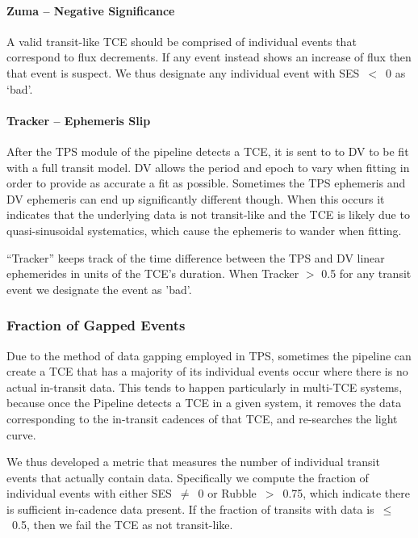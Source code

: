 \paragraph{Zuma -- Negative Significance}
\label{s:zuma}

A valid transit-like TCE should be comprised of individual events that correspond to flux decrements. If any event instead shows an increase of flux then that event is suspect. We thus designate any individual event with SES~$<$~0 as `bad'.


\paragraph{Tracker -- Ephemeris Slip}
\label{s:tracker}
After the TPS module of the \kepler{} pipeline detects a TCE, it is sent to to DV to be fit with a full transit model. DV allows the period and epoch to vary when fitting in order to provide as accurate a fit as possible. Sometimes the TPS ephemeris and DV ephemeris can end up significantly different though. When this occurs it indicates that the underlying data is not transit-like and the TCE is likely due to quasi-sinusoidal systematics, which cause the ephemeris to wander when fitting.

``Tracker'' keeps track of the time difference between the TPS and DV linear ephemerides in units of the TCE's duration. When Tracker $>$ 0.5 for any transit event we designate the event as 'bad'.


\subsubsection{Fraction of Gapped Events}
\label{s:rocky}

Due to the method of data gapping employed in TPS, sometimes the \kepler{} pipeline can create a TCE that has a majority of its individual events occur where there is no actual in-transit data. This tends to happen particularly in multi-TCE systems, because once the \kepler{} Pipeline detects a TCE in a given system, it removes the data corresponding to the in-transit cadences of that TCE, and re-searches the light curve. 

We thus developed a metric that measures the number of individual transit events that actually contain data. Specifically we compute the fraction of individual events with either SES~$\ne$~0 or Rubble~$>$~0.75, which indicate there is sufficient in-cadence data present. If the fraction of transits with data is~$\le$~0.5, then we fail the TCE as not transit-like.


